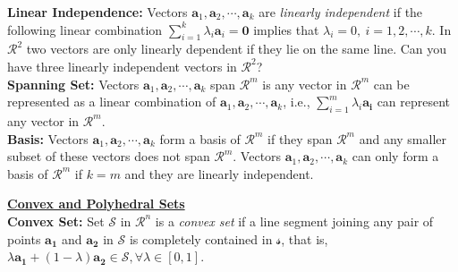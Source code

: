 {\bf Linear Independence:}  Vectors ${\mathbf a_1},{\mathbf a_2},\cdots,{\mathbf a_k}$ are {\it linearly independent} if the following linear combination $\sum_{i=1}^k \lambda_i {\mathbf a_i} = {\mathbf 0}$ implies that $\lambda_i = 0,~ i = 1,2,\cdots,k$. In $\mathcal{R}^2$ two vectors are only linearly dependent if they lie on the same line. Can you have three linearly independent vectors in $\mathcal{R}^2$? \\




{\bf Spanning Set:}  Vectors ${\mathbf a_1},{\mathbf a_2},\cdots,{\mathbf a_k}$ span $\mathcal{R}^m$ is any vector in $\mathcal{R}^m$ can be represented as a linear combination of ${\mathbf a_1},{\mathbf a_2},\cdots,{\mathbf a_k}$, i.e., $\sum_{i=1}^m\lambda_i\mathbf{a_i}$ can represent any vector in $\mathcal{R}^m$. \\

{\bf Basis:} Vectors ${\mathbf a_1},{\mathbf a_2},\cdots,{\mathbf a_k}$ form a basis of $\mathcal{R}^m$ if they span $\mathcal{R}^m$ and any smaller subset of these vectors does not span $\mathcal{R}^m$. Vectors ${\mathbf a_1},{\mathbf a_2},\cdots,{\mathbf a_k}$ can only form a basis of $\mathcal{R}^m$ if $k = m$ and they are linearly independent.

\newpage \underline{\bf Convex and Polyhedral Sets} \\

{\bf Convex Set:} Set $\mathcal{S}$ in $\mathcal{R}^n$ is a {\it convex set} if a line segment joining any pair of points $\mathbf{a_1}$ and $\mathbf{a_2}$ in $\mathcal{S}$ is completely contained in $\mathcal{s}$, that is, $\lambda\mathbf{a_1} + (1-\lambda)\mathbf{a_2} \in \mathcal{S}, \forall \lambda \in [0,1]$. \\

